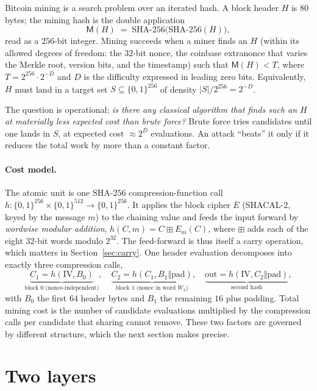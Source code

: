 \documentclass[11pt]{article}
\theoremstyle{remark}
\newcommand{\Mhash}{\mathsf{M}}
\newcommand{\SHA}{\mathrm{SHA\text{-}256}}
\begin{document}
Bitcoin mining is a search problem over an iterated hash. A block header
$H$ is $80$ bytes; the mining hash is the double application
\[
  \Mhash(H) \;=\; \SHA\!\big(\SHA(H)\big),
\]
read as a $256$-bit integer. Mining succeeds when a miner finds an $H$
(within its allowed degrees of freedom: the $32$-bit nonce, the
coinbase extranonce that varies the Merkle root, version bits, and the
timestamp) such that $\Mhash(H) < T$, where $T = 2^{256}\cdot 2^{-D}$
and $D$ is the difficulty expressed in leading zero bits. Equivalently,
$H$ must land in a target set $S \subseteq \{0,1\}^{256}$ of density
$|S|/2^{256} = 2^{-D}$.

The question is operational: \emph{is there any classical algorithm that
finds such an $H$ at materially less expected cost than brute force?}
Brute force tries candidates until one lands in $S$, at expected cost
$\approx 2^{D}$ evaluations. An attack ``beats'' it only if it reduces the
total work by more than a constant factor.

\paragraph{Cost model.}
The atomic unit is one $\SHA$ compression-function call
$h:\{0,1\}^{256}\times\{0,1\}^{512}\to\{0,1\}^{256}$. It applies the
block cipher $E$ (SHACAL-2, keyed by the message $m$) to the chaining
value and feeds the input forward by \emph{wordwise modular addition},
$h(C,m) = C \boxplus E_m(C)$, where $\boxplus$ adds each of the eight
$32$-bit words modulo $2^{32}$. The feed-forward is thus itself a carry
operation, which matters in Section~\ref{sec:carry}. One header
evaluation decomposes into exactly three compression calls,
\[
\underbrace{C_1 = h(\mathrm{IV},B_0)}_{\text{block 0 (nonce-independent)}},\quad
\underbrace{C_2 = h(C_1,B_1\Vert\mathrm{pad})}_{\text{block 1 (nonce in word }W_3)},\quad
\underbrace{\mathrm{out}=h(\mathrm{IV},C_2\Vert\mathrm{pad})}_{\text{second hash}},
\]
with $B_0$ the first $64$ header bytes and $B_1$ the remaining $16$ plus
padding. Total mining cost is the number of candidate evaluations
multiplied by the compression calls per candidate that sharing cannot
remove. These two factors are governed by different structure, which the
next section makes precise.

\section{Two layers}\label{sec:twolayers}
\end{document}
